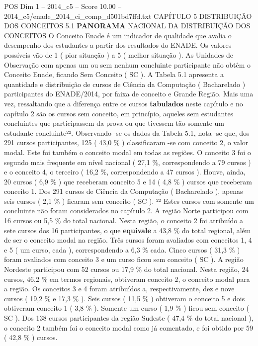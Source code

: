 \begin{textsample}{POS Dim 1 – 2014\_c5 – Score 10.00 – 2014\_c5/enade\_2014\_ci\_comp\_d501bd7ffd.txt}  \label{ex:f1_pos_101}
CAPÍTULO 5 DISTRIBUIÇÃO DOS CONCEITOS 5.1 \textbf{PANORAMA} NACIONAL DA DISTRIBUIÇÃO DOS CONCEITOS O Conceito Enade é um indicador de qualidade que avalia o desempenho dos estudantes a partir dos resultados do ENADE.
Os valores possíveis vão de 1 ( pior situação ) a 5 ( melhor situação ).
As Unidades de Observação com apenas um ou sem nenhum concluinte participante não obtêm o Conceito Enade, ficando Sem Conceito ( SC ).
A Tabela 5.1 apresenta a quantidade e distribuição de cursos de Ciência da Computação ( Bacharelado ) participantes do ENADE/2014, por faixa de conceito e Grande Região.
Mais uma vez, ressaltando que a diferença entre os cursos \textbf{tabulados} neste capítulo e no capítulo 2 são os cursos sem conceito, em princípio, aqueles sem estudantes concluintes que participassem da prova ou que tivessem tão somente um estudante concluinte²².
Observando -se os dados da Tabela 5.1, nota -se que, dos 291 cursos participantes, 125 ( 43,0 \% ) classificaram -se com conceito 2, o valor modal.
Este foi também o conceito modal em todas as regiões.
O conceito 3 foi o segundo mais frequente em nível nacional ( 27,1 \%, correspondendo a 79 cursos ) e o conceito 4, o terceiro ( 16,2 \%, correspondendo a 47 cursos ).
Houve, ainda, 20 cursos ( 6,9 \% ) que receberam conceito 5 e 14 ( 4,8 \% ) cursos que receberam conceito 1.
Dos 291 cursos de Ciência da Computação ( Bacharelado ), apenas seis cursos ( 2,1 \% ) ficaram sem conceito ( SC ). ²² Estes cursos com somente um concluinte não foram considerados no capítulo 2.
A região Norte participou com 16 cursos ou 5,5 \% do total nacional.
Nesta região, o conceito 2 foi atribuído a sete cursos dos 16 participantes, o que \textbf{equivale} a 43,8 \% do total regional, além de ser o conceito modal na região.
Três cursos foram avaliados com conceitos 1, 4 e 5 ( um curso, cada ), correspondendo a 6,3 \% cada.
Cinco cursos ( 31,3 \% ) foram avaliados com conceito 3 e um curso ficou sem conceito ( SC ).
A região Nordeste participou com 52 cursos ou 17,9 \% do total nacional.
Nesta região, 24 cursos, 46,2 \% em termos regionais, obtiveram conceito 2, o conceito modal para a região.
Os conceitos 3 e 4 foram atribuídos a, respectivamente, dez e nove cursos ( 19,2 \% e 17,3 \% ).
Seis cursos ( 11,5 \% ) obtiveram o conceito 5 e dois obtiveram conceito 1 ( 3,8 \% ).
Somente um curso ( 1,9 \% ) ficou sem conceito ( SC ).
Dos 138 cursos participantes da região Sudeste ( 47,4 \% do total nacional ), o conceito 2 também foi o conceito modal como já comentado, e foi obtido por 59 ( 42,8 \% ) cursos.

\end{textsample}
